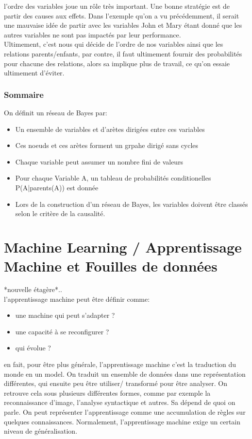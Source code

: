 \documentclass[oneside]{book}
\begin{document}
l'ordre des variables joue un rôle très important. Une bonne stratégie est de partir des causes aux effets. Dans l'exemple qu'on a vu précédemment, il serait une mauvaise idée de partir avec les variables John et Mary étant donné que les autres variables ne sont pas impactés par leur performance.\\

Ultimement, c'est nous qui décide de l'ordre de nos variables ainsi que les relations parents/enfants, par contre, il faut ultimement fournir des probabilités pour chacune des relations, alors sa implique plus de travail, ce qu'on essaie ultimement d'éviter.

\subsection{Sommaire}
On définit un réseau de Bayes par:

\begin{itemize}
\item Un ensemble de variables et d'arètes dirigées entre ces variables
\item Ces noeuds et ces arètes forment un grpahe dirigé sans cycles
\item Chaque variable peut assumer un nombre fini de valeurs
\item Pour chaque Variable A, un tableau de probabilités conditionelles P(A|parents(A)) est donnée
\item Lors de la construction d'un réseau de Bayes, les variables doivent être classés selon le critère de la causalité.
\end{itemize}
\chapter{Machine Learning / Apprentissage Machine et Fouilles de données}
*nouvelle étagère*..\\

l'apprentissage machine peut être définir comme:
\begin{itemize}
\item une machine qui peut s'adapter ?
\item une capacité à se reconfigurer ?
\item qui évolue ?
\end{itemize}

en fait, pour être plus générale, l'apprentissage machine c'est la traduction du monde en un model. On traduit un ensemble de données dans une représentation différentes, qui ensuite peu être utiliser/ transformé pour être analyser. On retrouve cela sous plusieurs différentes formes, comme par exemple la reconnaissance d'image, l'analyse syntactique et autres. Sa dépend de quoi on parle. On peut représenter l'apprentissage comme une accumulation de règles sur quelques connaissances. Normalement, l'apprentissage machine exige un certain niveau de généralisation. \\
\end{document}

